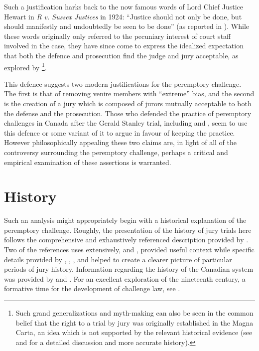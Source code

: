 Such a justification harks back to the now famous words of Lord Chief Justice Hewart in \textit{R v. Sussex Justices} in 1924:
``Justice should not only be done, but should manifestly and undoubtedly be seen to be done'' (as reported in
\cite{oakes2016}). While these words originally only referred to the pecuniary interest of court staff involved in the case, they
have since come to express the idealized expectation that both the defence and prosecution find the judge and jury acceptable, as
explored by \cite{oakes2016}\footnote{Such grand generalizations and myth-making can also be seen in the common belief that the
  right to a trial by jury was originally established in the Magna Carta, an idea which is not supported by the relevant
  historical evidence (see \cite{hoffman1997} and \cite{vandykejurysel} for a detailed discussion and more accurate history).}.

This defence suggests two modern justifications for the peremptory challenge. The first is that of removing venire members with
``extreme'' bias, and the second is the creation of a jury which is composed of jurors mutually acceptable to both the defense and
the prosecution. Those who defended the practice of peremptory challenges in Canada after the Gerald Stanley trial, including
\cite{peremparegood} and \cite{macnabproper}, seem to use this defence or some variant of it to argue in favour of keeping the
practice. However philosophically appealing these two claims are, in light of all of the controversy surrounding the peremptory
challenge, perhaps a critical and empirical examination of these assertions is warranted.

\section{History} \label{sec:history}

Such an analysis might appropriately begin with a historical explanation of the peremptory challenge. Roughly, the presentation of
the history of jury trials here follows the comprehensive and exhaustively referenced description provided by
\cite{hoffman1997}. Two of the references \citeauthor{hoffman1997} uses extensively, \cite{hansvidjudging} and
\cite{vandykejurysel}, provided useful context while specific details provided by \cite{vonmosch1921}, \cite{forsythhistory},
\cite{brown1978}, and \cite{brown2000} helped to create a clearer picture of particular periods of jury history. Information
regarding the history of the Canadian system was provided by \cite{brown2000} and \cite{petersen1993}. For an excellent
exploration of the nineteenth century, a formative time for the development of challenge law, see \cite{brown2000}.

